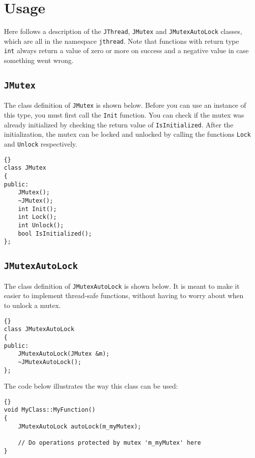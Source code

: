 \documentclass[a4paper,12pt]{article}
\begin{document}
	\section{Usage}

	Here follows a description of the {\tt JThread}, {\tt JMutex} and 
	{\tt JMutexAutoLock} classes, which are all in the namespace {\tt jthread}. 
	Note that functions with return type {\tt int} always return a value of zero
	or more on success and a negative value in case something went wrong. 

	\subsection{{\tt JMutex}}

	The class definition of {\tt JMutex} is shown below. Before you can use an
	instance of this type, you must first call the {\tt Init} function. You can
	check if the mutex was already initialized by checking the return value
	of {\tt IsInitialized}. After the initialization, the mutex can be locked
	and unlocked by calling the functions {\tt Lock} and {\tt Unlock} respectively.

\begin{lstlisting}[frame=tb]{}
class JMutex
{
public:
	JMutex();
	~JMutex();
	int Init();
	int Lock();
	int Unlock();
	bool IsInitialized();
};	
\end{lstlisting}

	\subsection{{\tt JMutexAutoLock}}

	The class definition of {\tt JMutexAutoLock} is shown below. It is meant
	to make it easier to implement thread-safe functions, without having to
	worry about when to unlock a mutex.

\begin{lstlisting}[frame=tb]{}
class JMutexAutoLock
{
public:
	JMutexAutoLock(JMutex &m);
	~JMutexAutoLock();
};
\end{lstlisting}

	The code below illustrates the way this class can be used:

\begin{lstlisting}[frame=tb]{}
void MyClass::MyFunction()
{
	JMutexAutoLock autoLock(m_myMutex);
	
	// Do operations protected by mutex 'm_myMutex' here
}
\end{lstlisting}
	
\end{document}
